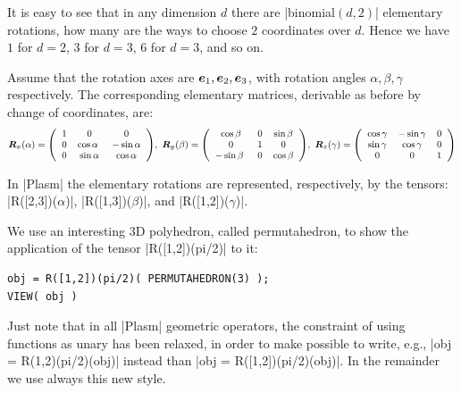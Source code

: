 \begin{remark}
It is easy to see that in any dimension $d$ there are |binomial$(d,2)$| elementary rotations, how many are the ways to choose $2$ coordinates over $d$. Hence we have $1$ for $d=2$, 3 for $d=3$, 6 for $d=3$, and so on.
\end{remark}


Assume that the rotation axes are ${\mbox{\boldmath $e$}}_1, {\mbox{\boldmath $e$}}_2, {\mbox{\boldmath $e$}}_3$, with rotation angles $\alpha, \beta, \gamma$ respectively. The corresponding elementary matrices, derivable as before by change of coordinates, are:
\begin{equation}\footnotesize
\T{R}_x(\alpha) = \mat{1 & 0 & 0 \\ 0 & \cos\alpha\ &  -\sin\alpha\\ 0 & \sin\alpha & \cos\alpha},\ 
\T{R}_y(\beta) = \mat{\cos\beta & 0 & \sin\beta\\ 0 & 1 & 0 \\ -\sin\beta\  &  0 & \cos\beta},\ 
\T{R}_z(\gamma) = \mat{\cos\gamma & -\sin\gamma & 0\\ \sin\gamma & \cos\gamma & 0\\ 0 & 0  &1}
\end{equation}

In |Plasm| the elementary rotations are represented, respectively, by the tensors: |R([2,3])($\alpha$)|, |R([1,3])($\beta$)|, and |R([1,2])($\gamma$)|. 
\begin{coding} We use an interesting 3D polyhedron, called permutahedron, to show the application of the tensor |R([1,2])(pi/2)| to it:
\begin{lstlisting}[language=JuliaLocal, style=julia, mathescape=false]
obj = R([1,2])(pi/2)( PERMUTAHEDRON(3) );
VIEW( obj )
\end{lstlisting}
\end{coding}

\begin{remark}
Just note that in all |Plasm| geometric operators, the constraint of using functions as unary has been relaxed, in order to make possible to write, e.g., |obj = R(1,2)(pi/2)(obj)| instead than |obj = R([1,2])(pi/2)(obj)|. In the remainder we use always this new style.
\end{remark}


